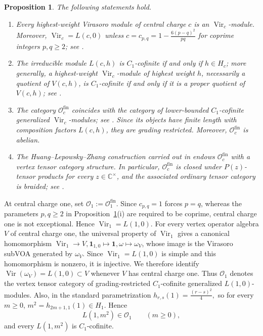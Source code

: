 \documentclass[12pt,leqno]{amsart}
\numberwithin{equation}{section} \newtheorem{thm}{Theorem}[section] \newtheorem{lem}[thm]{Lemma} \newtheorem{ex}[thm]{Example} \newtheorem{prop}[thm]{Proposition} \newtheorem{cor}[thm]{Corollary} \newtheorem{defi}[thm]{Definition} \newtheorem{rmk}[thm]{Remark} \newtheorem{notation}[thm]{Notation}
\newcommand{\one}{\mathbf{1}}
\newcommand{\Vir}{\operatorname{Vir}}
\newcommand{\Ovir}{\mathcal O_1}
\begin{document}
\begin{prop}
\label{prop:CJORY-package}
The following statements hold.
\begin{enumerate}[label=\textnormal{(\roman*)}]
\item Every highest-weight Virasoro module of central charge $c$ is an
$\Vir_c$-module. Moreover, \(\Vir_c=L(c,0)\) unless \(c=c_{p,q}=1-\frac{6(p-q)^2}{pq}\) for coprime integers $p,q\ge2$; see \cite[Section~2.2 and Corollary~2.2.5(4)]{CJORY}.

\item The irreducible module $L(c,h)$ is $C_1$-cofinite if and only if
$h\in H_c$; more generally, a highest-weight $\Vir_c$-module of highest weight $h$, necessarily a quotient of $V(c,h)$, is $C_1$-cofinite if and only if it is a proper quotient of $V(c,h)$; see \cite[Corollary~2.2.7]{CJORY}.

\item The category $\mathcal O_c^{\mathrm{fin}}$ coincides with the category of lower-bounded $C_1$-cofinite generalized $\Vir_c$-modules; see \cite[Theorem~3.1.4]{CJORY}. Since its objects have finite length with composition factors $L(c,h)$, they are grading restricted. Moreover, $\mathcal O_c^{\mathrm{fin}}$ is abelian.

\item The Huang--Lepowsky--Zhang construction carried out in
\cite[Sections~4.1--4.2]{CJORY} endows $\mathcal O_c^{\mathrm{fin}}$ with a vertex tensor category structure. In particular, $\mathcal O_c^{\mathrm{fin}}$ is closed under $P(z)$-tensor products for every $z\in\mathbb C^\times$, and the associated ordinary tensor category is braided; see \cite[Corollary~4.1.8 and Theorem~4.2.6]{CJORY}.
\end{enumerate}
\end{prop}

At central charge one, set \(\mathcal O_1:=\mathcal O_1^{\mathrm{fin}}\). Since $c_{p,q}=1$ forces $p=q$, whereas the parameters $p,q\ge2$ in Proposition~\ref{prop:CJORY-package}(i) are required to be coprime, central charge one is not exceptional. Hence \(\Vir_1=L(1,0)\). For every vertex operator algebra $V$ of central charge one, the universal property of \(\Vir_1\) gives a canonical homomorphism \(\Vir_1\longrightarrow V,\one_{1,0}\longmapsto\one,\omega\longmapsto\omega_V\), whose image is the Virasoro subVOA generated by \(\omega_V\). Since \(\Vir_1=L(1,0)\) is simple and this homomorphism is nonzero, it is injective. We therefore identify \(\operatorname{Vir}(\omega_V)=L(1,0)\subset V\) whenever \(V\) has central charge one. Thus \(\Ovir\) denotes the vertex tensor category of grading-restricted $C_1$-cofinite generalized $L(1,0)$-modules. Also, in the standard parametrization \(h_{r,s}(1)=\frac{(r-s)^2}{4},\) so for every $m\ge0$, \(m^2=h_{2m+1,1}(1)\in H_1.\) Hence
\begin{equation}\label{eq:square-C1-cofinite}
L(1,m^2)\in\Ovir\qquad(m\ge0),
\end{equation}
and every $L(1,m^2)$ is $C_1$-cofinite.
\end{document}
